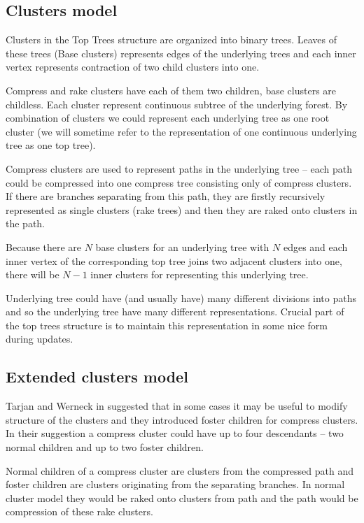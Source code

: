 \subsection{Clusters model}

Clusters in the Top Trees structure are organized into binary trees. Leaves of
these trees (Base clusters) represents edges of the underlying trees and each
inner vertex represents contraction of two child clusters into one.

Compress and rake clusters have each of them two children, base clusters are
childless. Each cluster represent continuous subtree of the underlying forest.
By combination of clusters we could represent each underlying tree as one {\I
root cluster} (we will sometime refer to the representation of one continuous
underlying tree as one {\I top tree}).

Compress clusters are used to represent paths in the underlying tree -- each
path could be compressed into one {\I compress tree} consisting only of compress
clusters. If there are branches separating from this path, they are firstly
recursively represented as single clusters ({\I rake trees}) and then they are
{\I raked onto} clusters in the path.

Because there are $N$ base clusters for an underlying tree with $N$ edges and
each inner vertex of the corresponding top tree joins two adjacent clusters into
one, there will be $N-1$ inner clusters for representing this underlying tree.

Underlying tree could have (and usually have) many different divisions into
paths and so the underlying tree have many different representations. Crucial
part of the top trees structure is to maintain this representation in some nice
form during updates.

\subsection{Extended clusters model}

Tarjan and Werneck in \cite{SelfAdjustingTT} suggested that in some cases it may
be useful to modify structure of the clusters and they introduced
{\I foster children} for {\I compress clusters}. In their suggestion a compress
cluster could have up to four descendants -- two normal children and up to two
foster children.

Normal children of a compress cluster are clusters from the compressed path and
foster children are clusters originating from the separating branches. In normal
cluster model they would be raked onto clusters from path and the path would be
compression of these rake clusters.

